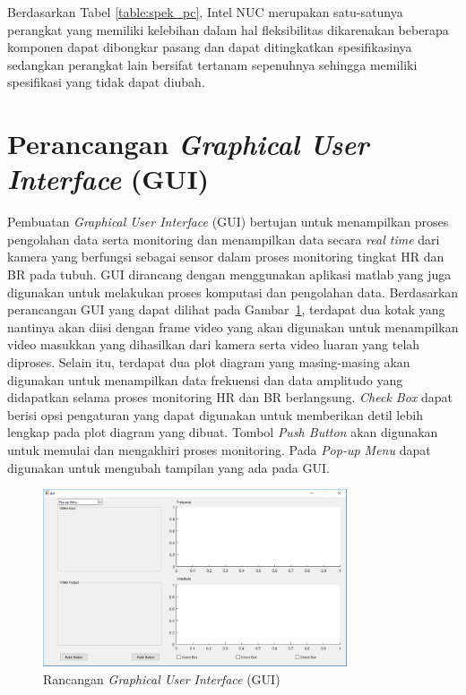 Berdasarkan Tabel  \ref{table:spek_pc}, Intel NUC merupakan satu-satunya perangkat yang memiliki kelebihan dalam hal fleksibilitas dikarenakan beberapa komponen dapat dibongkar pasang dan dapat ditingkatkan spesifikasinya sedangkan perangkat lain bersifat tertanam sepenuhnya sehingga memiliki spesifikasi yang tidak dapat diubah.




\section{Perancangan \textit{Graphical User Interface} (GUI)}
Pembuatan \textit{Graphical User Interface} (GUI) bertujan untuk menampilkan proses pengolahan data serta monitoring dan menampilkan data secara \textit{real time} dari kamera yang berfungsi sebagai sensor dalam proses monitoring tingkat HR dan BR pada tubuh. GUI dirancang dengan menggunakan aplikasi matlab yang juga digunakan untuk melakukan proses komputasi dan pengolahan data. Berdasarkan perancangan GUI yang dapat dilihat pada Gambar~\ref{fig:gui}, terdapat dua kotak yang nantinya akan diisi dengan frame video yang akan digunakan untuk menampilkan video masukkan yang dihasilkan dari kamera serta video luaran yang telah diproses. Selain itu, terdapat dua plot diagram yang masing-masing akan digunakan untuk menampilkan data frekuensi dan data amplitudo yang didapatkan selama proses monitoring HR dan BR berlangsung. \textit{Check Box} dapat berisi opsi pengaturan yang dapat digunakan untuk memberikan detil lebih lengkap pada plot diagram yang dibuat. Tombol \textit{Push Button} akan digunakan untuk memulai dan mengakhiri proses monitoring. Pada \textit{Pop-up Menu} dapat digunakan untuk mengubah tampilan yang ada pada GUI.

\begin{figure}[ht]
 \vspace{0.8em}
 \centering
 \includegraphics[width=0.8\textwidth]{gui}
 \caption{Rancangan \textit{Graphical User Interface} (GUI)}
 \label{fig:gui}   
\end{figure}

